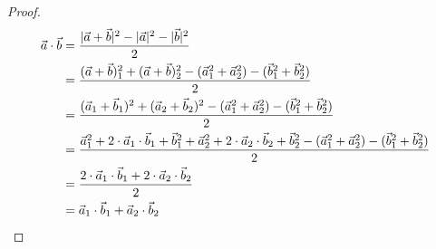 \documentclass{article}
\begin{document}
\begin{proof}
\begin{align*}
    \vec{a} \cdot \vec{b} &= \frac{|\vec{a} + \vec{b}|^2 - |\vec{a}|^2 - |\vec{b}|^2}{2}\\
                          &= \frac{(\vec{a} + \vec{b})_1^2 + (\vec{a} + \vec{b})_2^2 - (\vec{a}_1^2 + \vec{a}_2^2) - (\vec{b}_1^2 + \vec{b}_2^2)}{2}\\
                          &= \frac{(\vec{a}_1 + \vec{b}_1)^2 + (\vec{a}_2 + \vec{b}_2)^2 - (\vec{a}_1^2 + \vec{a}_2^2) - (\vec{b}_1^2 + \vec{b}_2^2)}{2}\\
                          &= \frac{\vec{a}_1^2 + 2 \cdot \vec{a}_1 \cdot \vec{b}_1 + \vec{b}_1^2 + \vec{a}_2^2 + 2 \cdot \vec{a}_2 \cdot \vec{b}_2 + \vec{b}_2^2 - (\vec{a}_1^2 + \vec{a}_2^2) - (\vec{b}_1^2 + \vec{b}_2^2)}{2}\\
                          &= \frac{2 \cdot \vec{a}_1 \cdot \vec{b}_1 + 2 \cdot \vec{a}_2 \cdot \vec{b}_2}{2}\\
                          &= \vec{a}_1 \cdot \vec{b}_1 + \vec{a}_2 \cdot \vec{b}_2\qedhere
\end{align*}
\end{proof}
\end{document}
